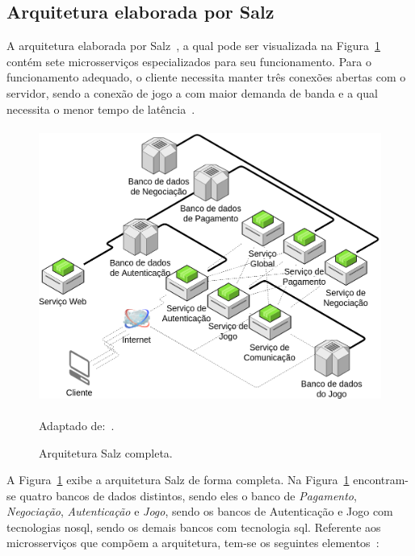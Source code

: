 \subsection{Arquitetura elaborada por Salz}
\label{salz}

A arquitetura elaborada por Salz~\cite{albion_online_unite}, a qual pode ser visualizada na Figura~\ref{full_salz} contém sete microsserviços especializados para seu funcionamento.
%
Para o funcionamento adequado, o cliente necessita manter três conexões abertas com o servidor, sendo a conexão de jogo a com maior demanda de banda e a qual necessita o menor tempo de latência~\cite{albion_online_unite}.

\begin{figure}[htb!]
  \caption{Arquitetura Salz completa.}
  \label{full_salz}
  \includegraphics[height=9.0cm]{arquiteturas/full_salz.png}
  \centering

  Adaptado de:~\cite{albion_online_unite}.
\end{figure}



A Figura~\ref{full_salz} exibe a arquitetura Salz de forma completa.
%
Na Figura~\ref{full_salz} encontram-se quatro bancos de dados distintos, sendo eles o banco de \textit{Pagamento}, \textit{Negociação}, \textit{Autenticação} e \textit{Jogo}, sendo os bancos de Autenticação e Jogo com tecnologias \ac{nosql}, sendo os demais bancos com tecnologia \ac{sql}.
%
Referente aos microsserviços que compõem a arquitetura, tem-se os seguintes elementos~\cite{salz_albion}:



